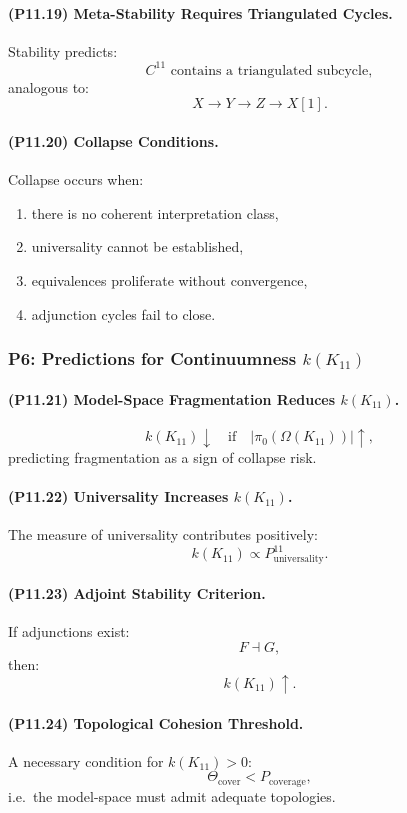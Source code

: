 \paragraph{(P11.19) Meta-Stability Requires Triangulated Cycles.}
Stability predicts:
\[
C^{11} \text{ contains a triangulated subcycle},
\]
analogous to:
\[
X \to Y \to Z \to X[1].
\]

\paragraph{(P11.20) Collapse Conditions.}
Collapse occurs when:
\begin{enumerate}
    \item there is no coherent interpretation class,
    \item universality cannot be established,
    \item equivalences proliferate without convergence,
    \item adjunction cycles fail to close.
\end{enumerate}

\subsubsection{P6: Predictions for Continuumness $k(K_{11})$}

\paragraph{(P11.21) Model-Space Fragmentation Reduces $k(K_{11})$.}
\[
k(K_{11}) \downarrow \quad\text{if}\quad
|\pi_0(\Omega(K_{11}))| \uparrow,
\]
predicting fragmentation as a sign of collapse risk.

\paragraph{(P11.22) Universality Increases $k(K_{11})$.}
The measure of universality contributes positively:
\[
k(K_{11}) \propto 
P_{\mathrm{universality}}^{11}.
\]

\paragraph{(P11.23) Adjoint Stability Criterion.}
If adjunctions exist:
\[
F \dashv G,
\]
then:
\[
k(K_{11}) \uparrow.
\]

\paragraph{(P11.24) Topological Cohesion Threshold.}
A necessary condition for $k(K_{11}) > 0$:
\[
\Theta_{\mathrm{cover}} < P_{\mathrm{coverage}},
\]
i.e.\ the model-space must admit adequate topologies.

